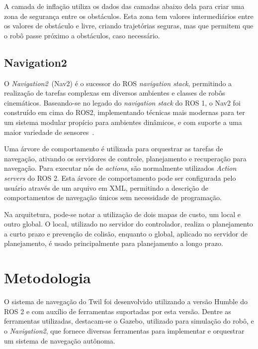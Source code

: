 \documentclass[repeatfields,xlists,xpacks,oneside,yearsonly]{ufrgscca}
\begin{document}
A camada de inflação utiliza os dados das camadas abaixo dela para
criar uma zona de segurança entre os obstáculos. Esta zona tem
valores intermediários entre os valores de obstáculo e livre, criando
trajetórias seguras, mas que permitem que o robô passe próximo a
obstáculos, caso necessário.

\section{Navigation2}


O \textit{Navigation2}~(Nav2) é o sucessor do ROS \textit{navigation
    stack}, permitindo a realização de tarefas complexas em diversos
ambientes e classes de robôs cinemáticos. Baseando-se no legado do
\textit{navigation stack} do ROS 1, o Nav2 foi construído em cima do
ROS2, implementando técnicas mais modernas para ter um sistema
modular propício para ambientes dinâmicos, e com suporte a uma maior
variedade de sensores~\cite{Nav2}.

Uma árvore de comportamento é utilizada para orquestrar as tarefas de
navegação, ativando os servidores de controle, planejamento e
recuperação para navegação. Para executar nós de \textit{actions},
são normalmente utilizados \textit{Action servers} do ROS 2. Esta
árvore de comportamento pode ser configurada pelo usuário através de
um arquivo em XML, permitindo a descrição de comportamentos de
navegação únicos sem necessidade de programação.

Na arquitetura, pode-se notar a utilização de dois mapas de custo, um
local e outro global. O local, utilizado no servidor do controlador,
realiza o planejamento a curto prazo e prevenção de colisão, enquanto
o global, aplicado no servidor de planejamento, é usado
principalmente para planejamento a longo prazo.

\chapter{Metodologia}
\label{desenvolvimento}

O sistema de navegação do Twil foi desenvolvido utilizando a versão
Humble do ROS 2 e com auxílio de ferramentas suportadas por esta
versão. Dentre as ferramentas utilizadas, destacam-se o Gazebo,
utilizado para simulação do robô, e o \textit{Navigation2}, que
fornece diversas ferramentas para implementar e orquestrar um sistema
de navegação autônoma.
\end{document}
